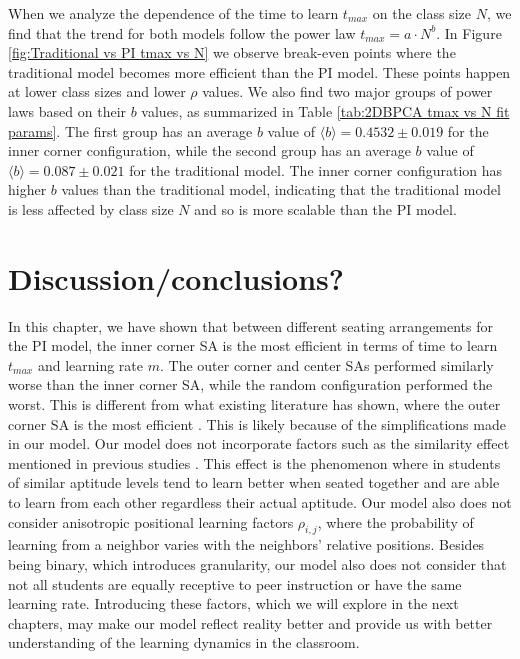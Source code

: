 When we analyze the dependence of the time to learn $t_{max}$ on the class size $N$, we find that the trend for both models follow the power law $t_{max} = a \cdot N^b$. In Figure \ref{fig:Traditional vs PI tmax vs N} we observe break-even points where the traditional model becomes more efficient than the PI model. These points happen at lower class sizes and lower $\rho$ values. We also find two major groups of power laws based on their $b$ values, as summarized in Table \ref{tab:2DBPCA tmax vs N fit params}. The first group has an average $b$ value of $\langle b \rangle = 0.4532 \pm 0.019$ for the inner corner configuration, while the second group has an average $b$ value of $\langle b \rangle = 0.087\pm0.021$ for the traditional model. The inner corner configuration has higher $b$ values than the traditional model, indicating that the traditional model is less affected by class size $N$ and so is more scalable than the PI model.

\section{Discussion/conclusions?}
In this chapter, we have shown that between different seating arrangements for the PI model, the inner corner SA is the most efficient in terms of time to learn $t_{max}$ and learning rate $m$. The outer corner and center SAs performed similarly worse than the inner corner SA, while the random configuration performed the worst. This is different from what existing literature has shown, where the outer corner SA is the most efficient \cite{roxas2010seating}. This is likely because of the simplifications made in our model. Our model does not incorporate factors such as the similarity effect mentioned in previous studies \cite{roxas2010seating,smith2009peer}. This effect is the phenomenon where in students of similar aptitude levels tend to learn better when seated together and are able to learn from each other regardless their actual aptitude. Our model also does not consider anisotropic positional learning factors $\rho_{i,j}$, where the probability of learning from a neighbor varies with the neighbors' relative positions. Besides being binary, which introduces granularity, our model also does not consider that not all students are equally receptive to peer instruction or have the same learning rate. Introducing these factors, which we will explore in the next chapters, may make our model reflect reality better and provide us with better understanding of the learning dynamics in the classroom.

